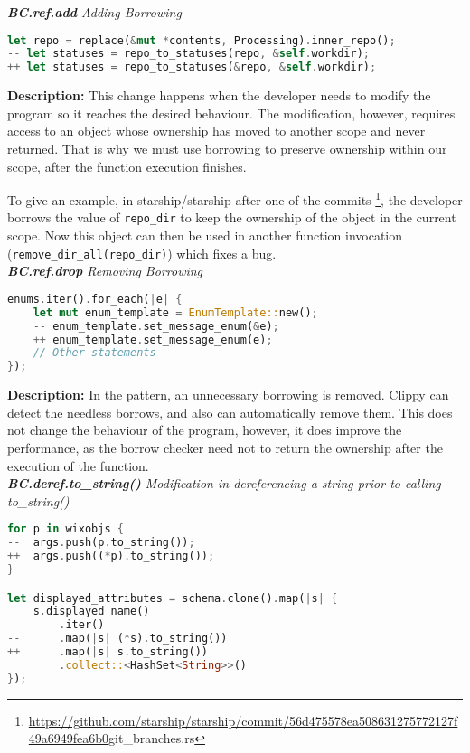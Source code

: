 \noindent \textit{ \textbf{BC.ref.add} Adding Borrowing}

\begin{lstlisting}[language=Rust, style=colouredRust]
let repo = replace(&mut *contents, Processing).inner_repo();
-- let statuses = repo_to_statuses(repo, &self.workdir);
++ let statuses = repo_to_statuses(&repo, &self.workdir);
\end{lstlisting}

\noindent \textbf{Description:} This change happens when the developer needs to modify the program so it reaches the desired behaviour. The modification, however, requires access to an object whose ownership has moved to another scope and never returned. That is why we must use borrowing to preserve ownership within our scope, after the function execution finishes.

To give an example, in starship/starship after one of the commits \footnote{\url{https://github.com/starship/starship/commit/56d475578ea508631275772127f49a6949fea6b0}{git\_branches.rs}}, the developer borrows the value of \verb+repo_dir+ to keep the ownership of the object in the current scope. Now this object can then be used in another function invocation (\verb+remove_dir_all(repo_dir)+) which fixes a bug. \\

\noindent \textit{ \textbf{BC.ref.drop} Removing Borrowing}

\begin{lstlisting}[language=Rust, style=colouredRust]
enums.iter().for_each(|e| {
    let mut enum_template = EnumTemplate::new();
    -- enum_template.set_message_enum(&e);
    ++ enum_template.set_message_enum(e);
    // Other statements
});
\end{lstlisting}

\noindent \textbf{Description:} In the pattern, an unnecessary borrowing is removed. Clippy can detect the needless borrows, and also can automatically remove them. This does not change the behaviour of the program, however, it does improve the performance, as the borrow checker need not to return the ownership after the execution of the function. \\


\noindent \textit{ \textbf{BC.deref.to\_string()} Modification in dereferencing a string prior to calling to\_string()}

\begin{lstlisting}[language=Rust, style=colouredRust]
for p in wixobjs {
--  args.push(p.to_string());
++  args.push((*p).to_string());
}

let displayed_attributes = schema.clone().map(|s| {
    s.displayed_name()
        .iter()
--      .map(|s| (*s).to_string())
++      .map(|s| s.to_string())
        .collect::<HashSet<String>>()
});
\end{lstlisting}

